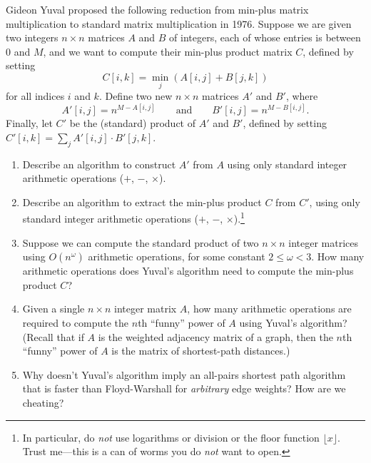 \begin{exercises}
\item Gideon Yuval proposed the following reduction from min-plus matrix multiplication to standard matrix multiplication in 1976.
Suppose we are given two integers $n \times n$ matrices $A$ and $B$ of integers, each of whose entries is between $0$ and $M$, and we want to compute their min-plus product matrix $C$, defined by setting
\[
C[i, k] = \min_j (A[i, j] + B[j, k])
\]
for all indices $i$ and $k$.
Define two new $n \times n$ matrices $A'$ and $B'$, where
\[
A'[i, j] = n^{M-A[i,j]} \qquad \text{and} \qquad B'[i, j] = n^{M-B[i,j]}.
\]
Finally, let $C'$ be the (standard) product of $A'$ and $B'$, defined by setting $C'[i, k] = \sum_j A'[i, j] \cdot B'[j, k]$.
\begin{enumerate}
\item Describe an algorithm to construct $A'$ from $A$ using only standard integer arithmetic operations ($+$, $-$, $\times$).
\item Describe an algorithm to extract the min-plus product $C$ from $C'$, using only standard integer arithmetic operations ($+$, $-$, $\times$).\footnote{In particular, do \textit{not} use logarithms or division or the floor function $\lfloor x \rfloor$. Trust me---this is a can of worms you do \textit{not} want to open.}
\item Suppose we can compute the standard product of two $n \times n$ integer matrices using $O(n^\omega)$ arithmetic operations, for some constant $2 \le \omega < 3$.
How many arithmetic operations does Yuval’s algorithm need to compute the min-plus product $C$?
\item Given a single $n \times n$ integer matrix $A$, how many arithmetic operations are required to compute the $n$th “funny” power of $A$ using Yuval’s algorithm? (Recall that if $A$ is the weighted adjacency matrix of a graph, then the $n$th “funny” power of $A$ is the matrix of shortest-path distances.)
\item Why doesn’t Yuval’s algorithm imply an all-pairs shortest path algorithm that is faster than Floyd-Warshall for \textit{arbitrary} edge weights?
How are we cheating?
\end{enumerate}
\end{exercises}
